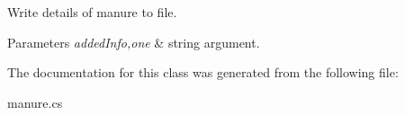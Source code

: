 Write details of manure to file. 


\begin{DoxyParams}{Parameters}
{\em added\+Info,one} & string argument. \\
\hline
\end{DoxyParams}


The documentation for this class was generated from the following file\+:\begin{DoxyCompactItemize}
\item 
manure.\+cs\end{DoxyCompactItemize}
